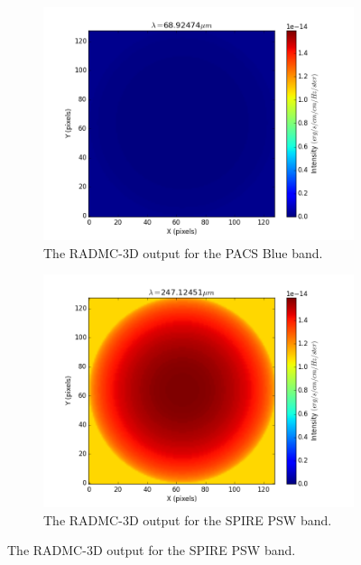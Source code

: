 \documentclass{report}
\begin{document}
\begin{figure}[H]
\centering

\begin{subfigure}[b]{.25\linewidth}
\includegraphics[width=\linewidth]{../img/output/blue.png}
\caption{The RADMC-3D output for the PACS Blue band.}\label{fig:isoblue}
\end{subfigure}
\begin{subfigure}[b]{.25\linewidth}
\includegraphics[width=\linewidth]{../img/output/psw.png}
\caption{The RADMC-3D output for the SPIRE PSW band.}\label{fig:isopsw}
\end{subfigure}


\end{figure}
\end{document}
